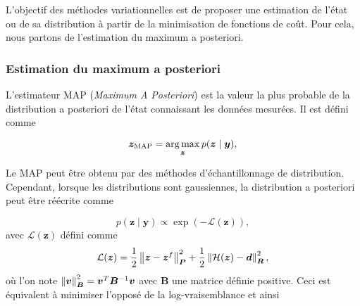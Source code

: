 L'objectif des méthodes variationnelles est de proposer une estimation de l'état ou de sa distribution à partir de la minimisation de fonctions de coût. Pour cela, nous partons de l'estimation du maximum a posteriori.

\subsubsection{Estimation du maximum a posteriori}

L'estimateur MAP (\textit{Maximum A Posteriori}) est la valeur la plus probable de la distribution a posteriori de l'état connaissant les données mesurées. Il est défini comme

\begin{equation*}
    \bm z_{\text{MAP}} = \operatorname*{arg\,max}_{\bm z} p(\bm z \mid \bm y),
\end{equation*}

Le MAP peut être obtenu par des méthodes d'échantillonnage de distribution. Cependant, lorsque les distributions sont gaussiennes, la distribution a posteriori peut être réécrite comme



\begin{equation*}
    p(\bm z \mid \bm y) \propto \exp\left(- \mathcal{L}(\bm z)\right),
\end{equation*}avec $\mathcal L(\bm z)$ défini comme
\begin{equation*}
    \mathcal L(\bm z) = \frac12 \left\lVert \bm z - \bm z^f \right\rVert^2_{ \bm{P}} + \frac12 \left\lVert \mathcal H(\bm z) - \bm d \right\rVert^2_{\bm{R}},
\end{equation*}où l'on note $\left\lVert \bm v \right\rVert^2_{\bm B} = \bm v^T \bm B^{-1} \bm v$ avec $\bm B$ une matrice définie positive. Ceci est équivalent à minimiser l'opposé de la log-vraisemblance et ainsi

